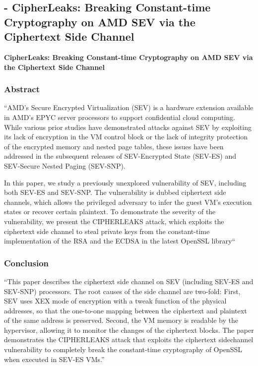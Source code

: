 
\subsection{\cite{li_cipherleaks_2021} - CipherLeaks: Breaking Constant-time Cryptography on AMD SEV via the Ciphertext Side Channel}

\textbf{CipherLeaks: Breaking Constant-time Cryptography on AMD SEV via the Ciphertext Side Channel}

\subsubsection*{Abstract \cite{li_cipherleaks_2021}}
“AMD’s Secure Encrypted Virtualization (SEV) is a hardware extension available in AMD’s EPYC server processors to support confidential cloud computing. While various prior studies have demonstrated attacks against SEV by exploiting its lack of encryption in the VM control block or the lack of integrity protection of the encrypted memory and nested page tables, these issues have been addressed in the subsequent releases of SEV-Encrypted State (SEV-ES) and SEV-Secure Nested Paging (SEV-SNP).

In this paper, we study a previously unexplored vulnerability of SEV, including both SEV-ES and SEV-SNP. The vulnerability is dubbed ciphertext side channels, which allows the privileged adversary to infer the guest VM’s execution states or recover certain plaintext. To demonstrate the severity of the vulnerability, we present the CIPHERLEAKS attack, which exploits the ciphertext side channel to steal private keys from the constant-time implementation of the RSA and the ECDSA in the latest OpenSSL library“

\subsubsection*{Conclusion \cite{li_cipherleaks_2021}}
“This paper describes the ciphertext side channel on SEV (including SEV-ES and SEV-SNP) processors. The root causes of the side channel are two-fold: First, SEV uses XEX mode of encryption with a tweak function of the physical addresses, so that the one-to-one mapping between the ciphertext and plaintext of the same address is preserved. Second, the VM memory is readable by the hypervisor, allowing it to monitor the changes of the ciphertext blocks. The paper demonstrates the CIPHERLEAKS attack that exploits the ciphertext sidechannel vulnerability to completely break the constant-time cryptography of OpenSSL when executed in SEV-ES VMs.”
